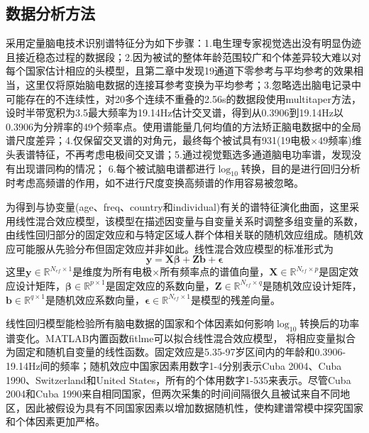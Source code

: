 \subsection{数据分析方法}\label{6ch:lme}
采用定量脑电技术识别谱特征分为如下步骤：1.电生理专家视觉选出没有明显伪迹且接近稳态过程的数据段；2.因为被试的整体年龄范围较广和个体差异较大难以对每个国家估计相应的头模型，且第二章中发现19通道下零参考与平均参考的效果相当，这里仅将原始脑电数据的连接耳参考变换为平均参考；3.忽略选出脑电记录中可能存在的不连续性，对20多个连续不重叠的2.56s的数据段使用multitaper方法，设时半带宽积为3.5最大频率为19.14Hz估计交叉谱，得到从0.3906到19.14Hz以0.3906为分辨率的49个频率点。使用谱能量几何均值的方法矫正脑电数据中的全局谱尺度差异；4.仅保留交叉谱的对角元，最终每个被试具有931(19电极$\times$49频率)维头表谱特征，不再考虑电极间交叉谱；5.通过视觉甄选多通道脑电功率谱，发现没有出现谱同构的情况； 6.每个被试脑电谱都进行$\log_{10}$转换，目的是进行回归分析时考虑高频谱的作用，如不进行尺度变换高频谱的作用容易被忽略。

为得到与协变量(age、freq、country和individual)有关的谱特征演化曲面，这里采用线性混合效应模型，该模型在描述因变量与自变量关系时调整多组变量的系数，由线性回归部分的固定效应和与特定区域人群个体相关联的随机效应组成。随机效应可能服从先验分布但固定效应并非如此。线性混合效应模型的标准形式为
\begin{equation*}
\mathbf{y=X\beta+Zb+\epsilon}
\end{equation*}
这里$\mathbf{y}\in{\mathbb{R}^{N_{ef}\times{1}}}$是维度为所有电极$\times$所有频率点的谱值向量，$\mathbf{X}\in{\mathbb{R}^{N_{ef}\times{p}}}$是固定效应设计矩阵，$\mathbf{\beta}\in{\mathbb{R}^{p\times{1}}}$是固定效应的系数向量，$\mathbf{Z}\in{\mathbb{R}^{N_{ef}\times{q}}}$是随机效应设计矩阵，$\mathbf{b}\in{\mathbb{R}^{q\times{1}}}$是随机效应系数向量，$\mathbf{\epsilon}\in{\mathbb{R}^{N_{ef}\times{1}}}$是模型的残差向量。

线性回归模型能检验所有脑电数据的国家和个体因素如何影响$\log_{10}$转换后的功率谱变化。MATLAB内置函数fitlme可以拟合线性混合效应模型，
将相应变量拟合为固定和随机自变量的线性函数。固定效应是5.35-97岁区间内的年龄和0.3906-19.14Hz间的频率；随机效应中国家因素用数字1-4分别表示Cuba 2004、Cuba 1990、Switzerland和United States，所有的个体用数字1-535来表示。尽管Cuba 2004和Cuba 1990来自相同国家，但两次采集的时间间隔很久且被试来自不同地区，因此被假设为具有不同国家因素以增加数据随机性，使构建谱常模中探究国家和个体因素更加严格。

